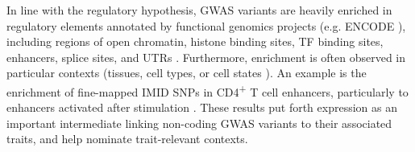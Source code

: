 \begin{outline}
In line with the regulatory hypothesis, \gls{GWAS} variants are heavily enriched in regulatory elements annotated by functional genomics projects (e.g. ENCODE \autocite{theencodeprojectconsortium2012IntegratedEncyclopediaDNA}), including
    regions of open chromatin, 
    histone binding sites, 
    \gls{TF} binding sites,
    enhancers,
    splice sites,
    and \glspl{UTR}
    \autocite{schaub2012LinkingDiseaseAssociations,maurano2012SystematicLocalizationCommon,farh2015GeneticEpigeneticFine,trynka2015DisentanglingEffectsColocalizing,nasser2020GenomewideMapsEnhancer}.
Furthermore, enrichment is often observed in particular contexts (tissues, cell types, or cell states \autocite{visscher201710YearsGWAS,gallagher2018PostGWASEraAssociation,cano-gamez2020GWASFunctionUsing}).
An example is the enrichment of fine-mapped \gls{IMID} \glspl{SNP} in CD4\textsuperscript{+} T cell enhancers, particularly to enhancers activated after stimulation \autocite{farh2015GeneticEpigeneticFine}.
These results put forth expression as an important intermediate linking non-coding \gls{GWAS} variants to their associated traits, 
and help nominate trait-relevant contexts.


\end{outline}
